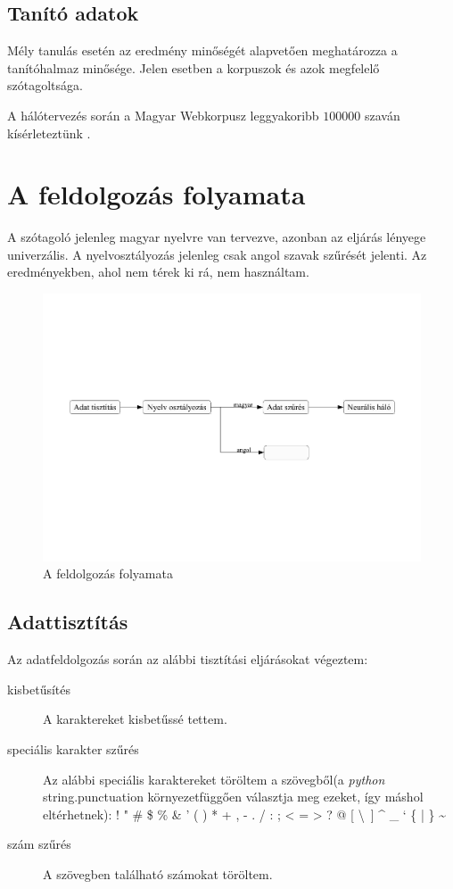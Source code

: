 \documentclass[a4paper, magyar]{article}
\begin{document}
\subsection{Tanító adatok}
Mély tanulás esetén az eredmény minőségét alapvetően meghatározza a tanítóhalmaz minősége. Jelen esetben a korpuszok és azok megfelelő szótagoltsága.

A hálótervezés során a Magyar Webkorpusz leggyakoribb $100000$ szaván kísérleteztünk \cite{halacsy2004creating,kornai2006web}.

\section{A feldolgozás folyamata}
A szótagoló jelenleg magyar nyelvre van tervezve, azonban az eljárás lényege univerzális. A nyelvosztályozás jelenleg csak angol szavak szűrését jelenti. Az eredményekben, ahol nem térek ki rá, nem használtam.
\begin{figure}[htp]
	\includegraphics[trim={0 7cm 0 7cm},clip,
	width=\textwidth]{figures/preprocessing.pdf}
	\caption{A feldolgozás folyamata}\par\medskip\centering
	\label{fig:gui}
\end{figure}
\subsection{Adattisztítás}
Az adatfeldolgozás során az alábbi tisztítási eljárásokat végeztem:
\begin{description}
	\item[kisbetűsítés] A karaktereket kisbetűssé tettem.
	\item[speciális karakter szűrés] Az alábbi speciális karaktereket töröltem a szövegből(a \textit{python} {\selectfont
		string.punctuation%
	} környezetfüggően választja meg ezeket, így máshol eltérhetnek): ! " \# \$ \% \& ' ( ) * + , - . / : ; < = > ? @ [ \textbackslash\, ] \^{} \_ ` \{ | \} \~{}
	\item[szám szűrés] A szövegben található számokat töröltem.
\end{description}
\end{document}
